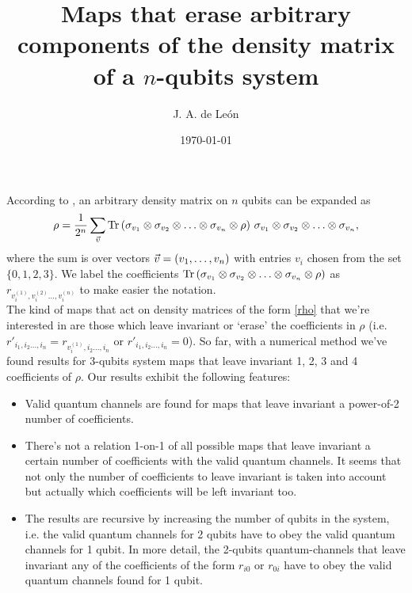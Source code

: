 \documentclass[11pt]{article}
\begin{document}
\title{Maps that erase arbitrary components of the density matrix of a $n$-qubits system} %
\author{J. A. de Le\'on} 


\date{\today}  

\maketitle


According to \cite{nielsen_chuang_2011}, an arbitrary density matrix on $n$ qubits can be expanded as
\begin{align}
	\rho = \frac{1}{2^n}\sum _{\vec{v}} \Tr \qty( \sigma _{v_1} \otimes \sigma_{v_2} \otimes \ldots \otimes \sigma_{v_n} \otimes \rho )\  \sigma _{v_1} \otimes \sigma_{v_2} \otimes \ldots \otimes \sigma_{v_n},
	\label{rho}
\end{align}
where the sum is over vectors $\vec{v}=\qty(v_1,\ldots, v_n)$ with entries $v_i$ chosen from the set $\{0,1,2,3\}$. We label the coefficients $\Tr \qty( \sigma _{v_1} \otimes \sigma_{v_2} \otimes \ldots \otimes \sigma_{v_n} \otimes \rho )$ as $r_{v_i^{(1)}, v_i^{(2)}\ldots, v_i^{(n)}}$ to make easier the notation. \\

The kind of maps that act on density matrices of the form \eqref{rho} that we're interested in are those which leave invariant or
`erase' the coefficients in $\rho$ (i.e. $r'_{i_1, i_2\ldots, i_n}=r_{v_i^{(1)}, i_2\ldots, i_n}$ or $r'_{i_1, i_2\ldots, i_n}=0$). So far, with
a numerical method we've found results for 3-qubits system maps that leave invariant 1, 2, 3 and 4 coefficients of $\rho$. Our
results exhibit the following features:
\begin{itemize}
	\item Valid quantum channels are found for maps that leave invariant a power-of-2 number of coefficients.
	\item There's not a relation 1-on-1 of all possible maps that leave invariant a certain number of coefficients with the valid
	quantum channels. It seems that not only the number of coefficients to leave invariant is taken into account but actually
	which coefficients will be left invariant too.
	\item The results are recursive by increasing the number of qubits in the system, i.e. the valid quantum channels for 2
	qubits have to obey the valid quantum channels for 1 qubit. In more detail, the 2-qubits quantum-channels that leave
	invariant any of the coefficients of the form $r_{i0}$ or $r_{0i}$ have to obey the valid quantum channels found for 1
	qubit.
\end{itemize}
\end{document}
